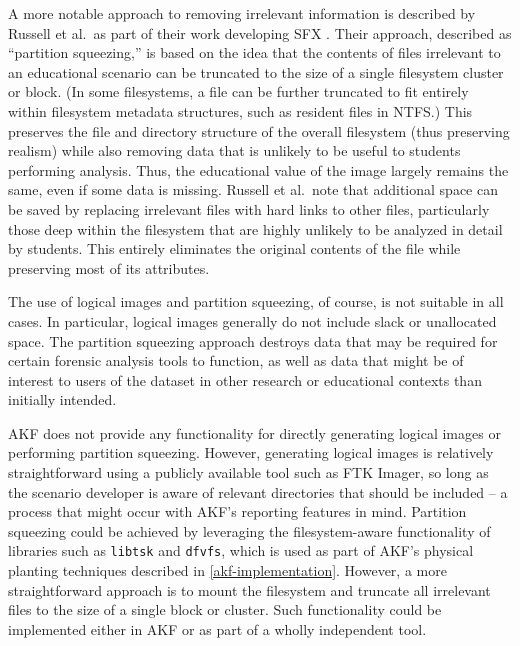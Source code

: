A more notable approach to removing irrelevant information is described
by Russell et al.~as part of their work developing SFX
\cite{russellForensicImageDescription2012}. Their approach,
described as ``partition squeezing,'' is based on the idea that the
contents of files irrelevant to an educational scenario can be truncated
to the size of a single filesystem cluster or block. (In some
filesystems, a file can be further truncated to fit entirely within
filesystem metadata structures, such as resident files in NTFS.) This
preserves the file and directory structure of the overall filesystem
(thus preserving realism) while also removing data that is unlikely to
be useful to students performing analysis. Thus, the educational value
of the image largely remains the same, even if some data is missing.
Russell et al.~note that additional space can be saved by replacing
irrelevant files with hard links to other files, particularly those deep
within the filesystem that are highly unlikely to be analyzed in detail
by students. This entirely eliminates the original contents of the file
while preserving most of its attributes.

The use of logical images and partition squeezing, of course, is not
suitable in all cases. In particular, logical images generally do not
include slack or unallocated space. The partition squeezing approach
destroys data that may be required for certain forensic analysis tools
to function, as well as data that might be of interest to users of the
dataset in other research or educational contexts than initially
intended.

AKF does not provide any functionality for directly generating logical
images or performing partition squeezing. However, generating logical
images is relatively straightforward using a publicly available tool
such as FTK Imager, so long as the scenario developer is aware of
relevant directories that should be included -- a process that might
occur with AKF's reporting features in mind. Partition squeezing could
be achieved by leveraging the filesystem-aware functionality of
libraries such as \passthrough{\lstinline!libtsk!} and
\passthrough{\lstinline!dfvfs!}, which is used as part of AKF's physical
planting techniques described in \autoref{akf-implementation}. However, a more straightforward approach is to
mount the filesystem and truncate all irrelevant files to the size of a
single block or cluster. Such functionality could be implemented either
in AKF or as part of a wholly independent tool.

